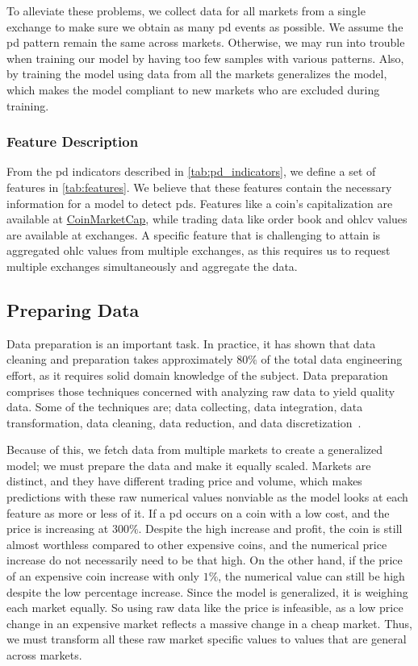 To alleviate these problems, we collect data for all markets from a single exchange to make sure we obtain as many \ac{pd} events as possible. We assume the \ac{pd} pattern remain the same across markets. Otherwise, we may run into trouble when training our model by having too few samples with various patterns. Also, by training the model using data from all the markets generalizes the model, which makes the model compliant to new markets who are excluded during training.

\subsubsection{Feature Description}
From the \ac{pd} indicators described in \autoref{tab:pd_indicators}, we define a set of features in \autoref{tab:features}. We believe that these features contain the necessary information for a model to detect \acp{pd}. Features like a coin's capitalization are available at \href{https://coinmarketcap.com/}{CoinMarketCap}, while trading data like order book and \ac{ohlcv} values are available at exchanges. A specific feature that is challenging to attain is aggregated \ac{ohlc} values from multiple exchanges, as this requires us to request multiple exchanges simultaneously and aggregate the data.



\subsection{Preparing Data}\label{sec:prep}
Data preparation is an important task. In practice, it has shown that data cleaning and preparation takes approximately $80\%$ of the total data engineering effort, as it requires solid domain knowledge of the subject. Data preparation comprises those techniques concerned with analyzing raw data to yield quality data. Some of the techniques are; data collecting, data integration, data transformation, data cleaning, data reduction, and data discretization~\cite{zhang2003data}.

Because of this, we fetch data from multiple markets to create a generalized model; we must prepare the data and make it equally scaled. Markets are distinct, and they have different trading price and volume, which makes predictions with these raw numerical values nonviable as the model looks at each feature as more or less of it. If a \ac{pd} occurs on a coin with a low cost, and the price is increasing at $300\%$. Despite the high increase and profit, the coin is still almost worthless compared to other expensive coins, and the numerical price increase do not necessarily need to be that high. On the other hand, if the price of an expensive coin increase with only $1\%$, the numerical value can still be high despite the low percentage increase. Since the model is generalized, it is weighing each market equally. So using raw data like the price is infeasible, as a low price change in an expensive market reflects a massive change in a cheap market. Thus, we must transform all these raw market specific values to values that are general across markets.

